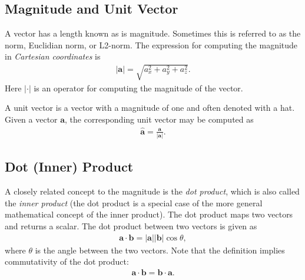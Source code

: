 \subsection{Magnitude and Unit Vector}

A vector has a length known as is magnitude. Sometimes this is referred to as the norm, Euclidian norm, or L2-norm. The expression for computing the magnitude in \emph{Cartesian coordinates} is
\begin{align}
  | \mathbf{a} | = \sqrt{ a_x^2 + a_y^2 + a_z^2 }.
\end{align}
Here $| \cdot |$ is an operator for computing the magnitude of the vector.

A unit vector is a vector with a magnitude of one and often denoted with a hat. Given a vector $\mathbf{a}$, the corresponding unit vector may be computed as
\begin{align}
  \hat{\mathbf{a}} = \frac{ \mathbf{a} }{ | \mathbf{a} | }.
\end{align}

\subsection{Dot (Inner) Product} \label{Sec:linearAlgebra_Vectors_DotProduct}

A closely related concept to the magnitude is the \emph{dot product}, which is also called the \emph{inner product} (the dot product is a special case of the more general mathematical concept of the inner product). The dot product maps two vectors and returns a scalar. The dot product between two vectors is given as
\begin{align} \label{Eqn:linearAlgebra_DotProductDefinition}
  \mathbf{a} \cdot \mathbf{b} = | \mathbf{a} | | \mathbf{b} | \cos \theta,
\end{align}
where $\theta$ is the angle between the two vectors. Note that the definition implies commutativity of the dot product:
\begin{align}
  \mathbf{a} \cdot \mathbf{b} = \mathbf{b} \cdot \mathbf{a}.
\end{align}

